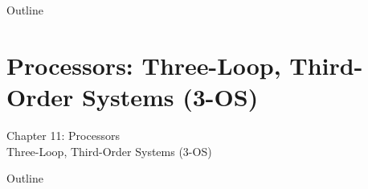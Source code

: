 \documentclass[aspectratio=169,11pt]{beamer}
\begin{document}
\begin{frame}{Outline}
\tableofcontents[sections=4]
\end{frame}


\section{Processors: Three-Loop, Third-Order Systems (3-OS)}

\begin{frame}
\begin{center}
{\Huge Chapter 11: Processors}\\[0.5cm]
{\Large Three-Loop, Third-Order Systems (3-OS)}\\[0.5cm]
\end{center}
\end{frame}

\begin{frame}{Outline}
\tableofcontents[sections=5]
\end{frame}

\end{document}
